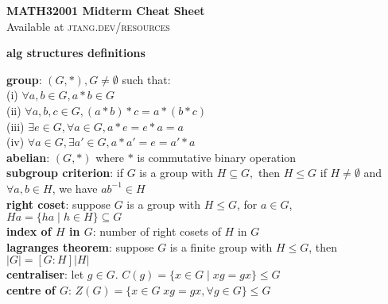 \documentclass[a4paper]{article}
\begin{document}
	
\begin{center}
	\huge{\textbf{MATH32001 Midterm Cheat Sheet}}\\
	\small{Available at \textsc{jtang.dev/resources}}\\
\end{center}
\begin{multicols}{2}
	
\begin{framed}
	\begin{center}
		\textbf{alg structures definitions}
	\end{center}
	
	\noindent
	\textbf{group}: $(G, *), G \neq \emptyset$ such that:\\
	(i) $\forall a, b \in G, a * b \in G$\\
	(ii) $\forall a, b, c \in G, (a * b) * c = a * (b * c)$\\
	(iii) $\exists e \in G, \forall a \in G, a * e = e * a = a$\\
	(iv) $\forall a \in G, \exists a' \in G, a * a' = e = a' * a$\\
	
	\noindent
	\textbf{abelian}: $(G, *)$ where $*$ is commutative binary operation\\
	
	\noindent
	\textbf{subgroup criterion}: if $G$ is a group with $H \subseteq G,$ then $H \leq G$ if $H \neq \emptyset$ and $\forall a, b \in H$, we have $ab^{-1} \in H$\\
	
	\noindent
	\textbf{right coset}: suppose $G$ is a group with $H \leq G$, for $a \in G$, $Ha = \{ha \; \vert \; h \in H\} \subseteq G$\\
	
	\noindent
	\textbf{index of $H$ in $G$}: number of right cosets of $H$ in $G$\\
	
	\noindent
	\textbf{lagranges theorem}: suppose $G$ is a finite group with $H \leq G$, then $\vert G \vert = [G : H]\vert H \vert$\\
	
	\noindent
	\textbf{centraliser}: let $g \in G.$ $C(g) = \{x \in G \; \vert \; xg = gx\} \leq G$\\
	
	\noindent
	\textbf{centre of $G$}: $Z(G) = \{x \in G \; xg = gx, \forall g \in G \} \leq G$\\
	

\end{framed}
\end{multicols}
\end{document}
